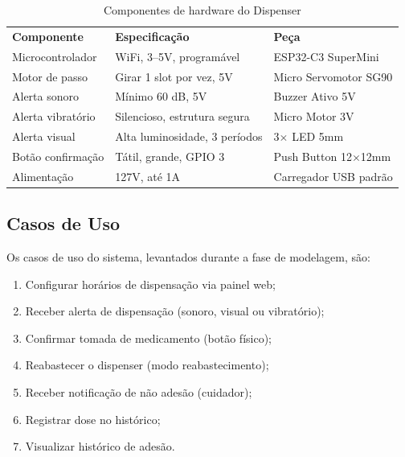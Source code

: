 \documentclass[12pt,a4paper]{article}
\newcommand{\lightrule}{\arrayrulecolor{gray!35}\midrule\arrayrulecolor{black}}
\begin{document}
\begin{table}[H]
    \centering
    \caption{Componentes de hardware do Dispenser}
    \label{tab:hardware}
    \begin{tabularx}{\textwidth}{lXl}
        \toprule
        \textbf{Componente}   & \textbf{Especificação}                & \textbf{Peça} \\
        \lightrule
        Microcontrolador      & WiFi, 3--5V, programável              & ESP32-C3 SuperMini \\
        \lightrule
        Motor de passo        & Girar 1 slot por vez, 5V              & Micro Servomotor SG90 \\
        \lightrule
        Alerta sonoro         & Mínimo 60 dB, 5V                      & Buzzer Ativo 5V \\
        \lightrule
        Alerta vibratório     & Silencioso, estrutura segura          & Micro Motor 3V \\
        \lightrule
        Alerta visual         & Alta luminosidade, 3 períodos         & 3$\times$ LED 5mm \\
        \lightrule
        Botão confirmação     & Tátil, grande, GPIO 3                 & Push Button 12$\times$12mm \\
        \lightrule
        Alimentação           & 127V, até 1A                          & Carregador USB padrão \\
        \bottomrule
    \end{tabularx}
\end{table}

\subsection{Casos de Uso}

Os casos de uso do sistema, levantados durante a fase de modelagem, são:

\begin{enumerate}
    \item Configurar horários de dispensação via painel web;
    \item Receber alerta de dispensação (sonoro, visual ou vibratório);
    \item Confirmar tomada de medicamento (botão físico);
    \item Reabastecer o dispenser (modo reabastecimento);
    \item Receber notificação de não adesão (cuidador);
    \item Registrar dose no histórico;
    \item Visualizar histórico de adesão.
\end{enumerate}
\end{document}
